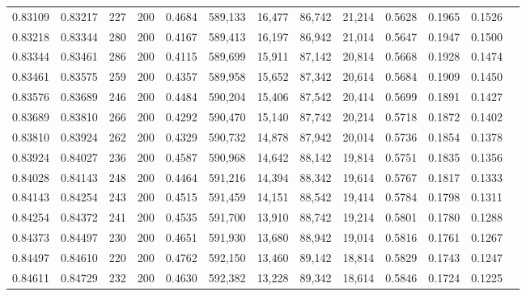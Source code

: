 \begin{tabular}{rrrrrrrrrrrrr}
0.83109 & 0.83217 &    227 & 200 &                                     0.4684 & 589,133 &  16,477 &  86,742 &  21,214 & 0.5628 & 0.1965 & 0.1526 \\
0.83218 & 0.83344 &    280 & 200 &                                     0.4167 & 589,413 &  16,197 &  86,942 &  21,014 & 0.5647 & 0.1947 & 0.1500 \\
0.83344 & 0.83461 &    286 & 200 &                                     0.4115 & 589,699 &  15,911 &  87,142 &  20,814 & 0.5668 & 0.1928 & 0.1474 \\
0.83461 & 0.83575 &    259 & 200 &                                     0.4357 & 589,958 &  15,652 &  87,342 &  20,614 & 0.5684 & 0.1909 & 0.1450 \\
0.83576 & 0.83689 &    246 & 200 &                                     0.4484 & 590,204 &  15,406 &  87,542 &  20,414 & 0.5699 & 0.1891 & 0.1427 \\
0.83689 & 0.83810 &    266 & 200 &                                     0.4292 & 590,470 &  15,140 &  87,742 &  20,214 & 0.5718 & 0.1872 & 0.1402 \\
0.83810 & 0.83924 &    262 & 200 &                                     0.4329 & 590,732 &  14,878 &  87,942 &  20,014 & 0.5736 & 0.1854 & 0.1378 \\
0.83924 & 0.84027 &    236 & 200 &                                     0.4587 & 590,968 &  14,642 &  88,142 &  19,814 & 0.5751 & 0.1835 & 0.1356 \\
0.84028 & 0.84143 &    248 & 200 &                                     0.4464 & 591,216 &  14,394 &  88,342 &  19,614 & 0.5767 & 0.1817 & 0.1333 \\
0.84143 & 0.84254 &    243 & 200 &                                     0.4515 & 591,459 &  14,151 &  88,542 &  19,414 & 0.5784 & 0.1798 & 0.1311 \\
0.84254 & 0.84372 &    241 & 200 &                                     0.4535 & 591,700 &  13,910 &  88,742 &  19,214 & 0.5801 & 0.1780 & 0.1288 \\
0.84373 & 0.84497 &    230 & 200 &                                     0.4651 & 591,930 &  13,680 &  88,942 &  19,014 & 0.5816 & 0.1761 & 0.1267 \\
0.84497 & 0.84610 &    220 & 200 &                                     0.4762 & 592,150 &  13,460 &  89,142 &  18,814 & 0.5829 & 0.1743 & 0.1247 \\
0.84611 & 0.84729 &    232 & 200 &                                     0.4630 & 592,382 &  13,228 &  89,342 &  18,614 & 0.5846 & 0.1724 & 0.1225 \\

\end{tabular}
